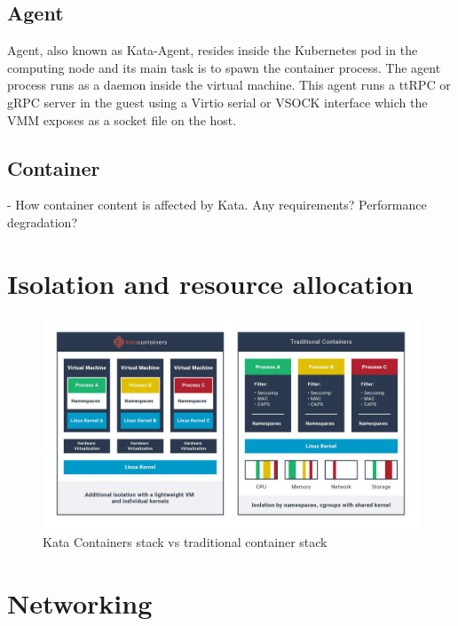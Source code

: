 \subsection{Agent}

Agent, also known as Kata-Agent, resides inside the Kubernetes pod in the computing node and its main task is to spawn the container process. The agent process runs as a daemon inside the virtual machine. This agent runs a ttRPC or gRPC server in the guest using a Virtio serial or VSOCK interface which the VMM exposes as a socket file on the host. \cite{KataContainersArchitecture}


\subsection{Container}

- How container content is affected by Kata. Any requirements? Performance degradation?


\section{Isolation and resource allocation}

\begin{figure}[ht]
  \begin{center}
    \includegraphics[width=13.5cm]{LaTeX/images/KataContainersStack.jpg}
    \caption{Kata Containers stack vs traditional container stack\cite{KataContainers}}
    \label{fig:KataContainersStack}
  \end{center}
\end{figure} 

\section{Networking}

